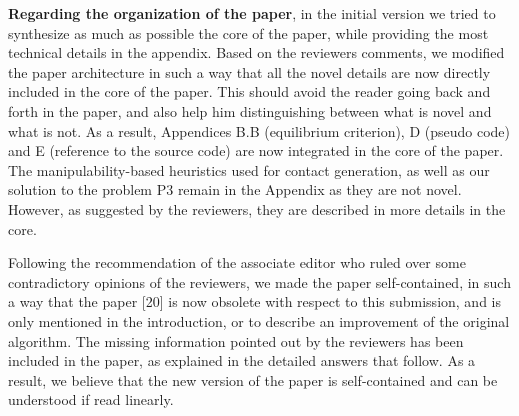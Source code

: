 \documentclass[a4paper]{article}
\begin{document}
\textbf{Regarding the organization of the paper}, in the initial version we tried to synthesize as much as possible
the core of the paper, while providing the most technical details in the appendix. Based on the reviewers comments, we modified
the paper architecture in such a way that all the novel details are now directly included in the core of the paper. This should avoid the reader going back and forth
in the paper, and also help him distinguishing between what is novel and what is not. As a result,  Appendices B.B (equilibrium criterion), D (pseudo code) and E (reference to the source code) are now integrated in the core of the paper. The manipulability-based heuristics used for contact generation, as well as our solution to the problem P3 remain in the Appendix as they are not novel. However, as suggested by the reviewers, they are described in more details in the core. 

Following the recommendation of the associate editor who ruled over some contradictory opinions of the reviewers, we made the paper self-contained,
in such a way that the paper [20] is now obsolete with respect to this submission, and is only mentioned in the introduction, or to describe an improvement
of the original algorithm. The missing information pointed out by the reviewers has been 
included in the paper, as explained in the detailed answers that follow. As a result, we believe that the new version of the paper is self-contained and can be understood if read linearly.\\

\end{document}
